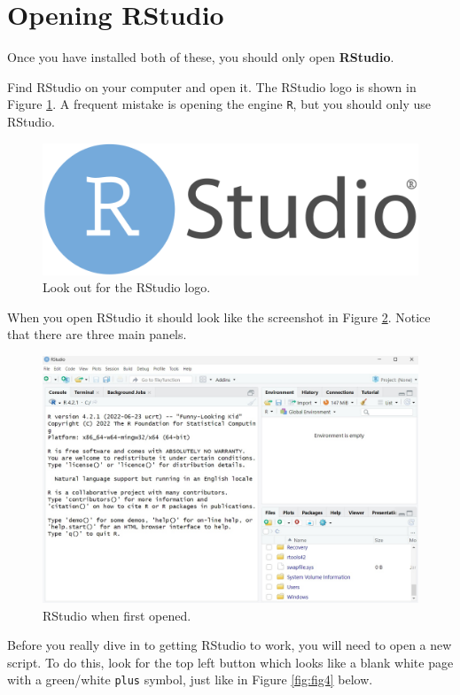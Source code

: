 \documentclass[
]{book}
\let\oldsection\section
\renewcommand{\section}{\needspace{5\baselineskip}\oldsection}
\begin{document}
\section{Opening RStudio}\label{opening-rstudio}

Once you have installed both of these, you should only open \textbf{RStudio}.

Find RStudio on your computer and open it. The RStudio logo is shown in Figure \ref{fig:fig2}. A frequent mistake is opening the engine \texttt{R}, but you should only use RStudio.

\begin{figure}

{\centering \includegraphics[width=0.25\linewidth]{images/RStudio} 

}

\caption{Look out for the RStudio logo.}\label{fig:fig2}
\end{figure}

When you open RStudio it should look like the screenshot in Figure \ref{fig:fig3}. Notice that there are three main panels.

\begin{figure}

{\centering \includegraphics[width=1\linewidth]{images/rstudio1} 

}

\caption{RStudio when first opened.}\label{fig:fig3}
\end{figure}

Before you really dive in to getting RStudio to work, you will need to open a new script. To do this, look for the top left button which looks like a blank white page with a green/white \texttt{plus} symbol, just like in Figure \ref{fig:fig4} below.
\end{document}
